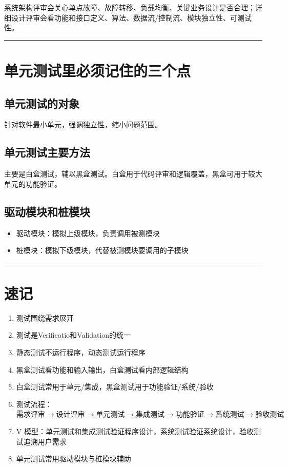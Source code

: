 \documentclass[11pt]{article}
\begin{document}
系统架构评审会关心单点故障、故障转移、负载均衡、关键业务设计是否合理；详细设计评审会看功能和接口定义、算法、数据流/控制流、模块独立性、可测试性。


\noindent\rule{\textwidth}{0.5pt}
\section{单元测试里必须记住的三个点}
\label{sec:org1a62835}
\subsection{单元测试的对象}
\label{sec:org761d30e}
针对软件最小单元，强调独立性，缩小问题范围。
\subsection{单元测试主要方法}
\label{sec:orgcf42cf2}
主要是白盒测试，辅以黑盒测试。白盒用于代码评审和逻辑覆盖，黑盒可用于较大单元的功能验证。
\subsection{驱动模块和桩模块}
\label{sec:org8f0de92}
\begin{itemize}
\item 驱动模块：模拟上级模块，负责调用被测模块
\item 桩模块：模拟下级模块，代替被测模块要调用的子模块
\end{itemize}


\noindent\rule{\textwidth}{0.5pt}
\section{速记}
\label{sec:org845dc04}

\begin{enumerate}
\item 测试围绕需求展开
\item 测试是Verificatio和Validation的统一
\item 静态测试不运行程序，动态测试运行程序
\item 黑盒测试看功能和输入输出，白盒测试看内部逻辑结构
\item 白盒测试常用于单元/集成，黑盒测试用于功能验证/系统/验收
\item 测试流程：\(需求评审 \rightarrow 设计评审 \rightarrow 单元测试 \rightarrow 集成测试 \rightarrow 功能验证 \rightarrow 系统测试 \rightarrow 验收测试\)
\item V 模型：单元测试和集成测试验证程序设计，系统测试验证系统设计，验收测试追溯用户需求
\item 单元测试常用驱动模块与桩模块辅助
\end{enumerate}
\end{document}
